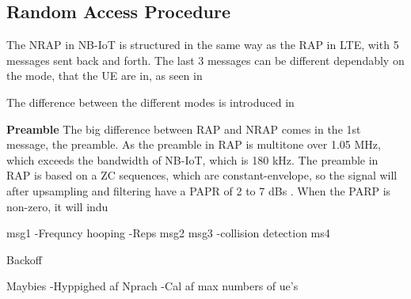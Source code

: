 \subsection{Random Access Procedure}
The \gls{NRAP} in \gls{NB-IoT} is structured in the same way as the \gls{RAP} in \gls{LTE}, with 5 messages sent back and forth. The last 3 messages can be different dependably on the mode, that the \gls{UE} are in, as seen in 

The difference between the different modes is introduced in 


\textbf{Preamble}
The big difference between \gls{RAP} and \gls{NRAP} comes in the 1st message, the preamble. As the preamble in \gls{RAP} is multitone over 1.05 MHz, which exceeds the bandwidth of \gls{NB-IoT}, which is 180 kHz. The preamble in \gls{RAP} is based on a \gls{ZC} sequences, which are constant-envelope, so the signal will after upsampling and filtering have a \gls{PAPR}  of 2 to 7 dBs . When the \gls{PARP} is non-zero, it will indu

msg1
-Frequncy hooping
-Reps
msg2
msg3
-collision detection
ms4

Backoff

Maybies
-Hyppighed af Nprach
-Cal af max numbers of ue's




